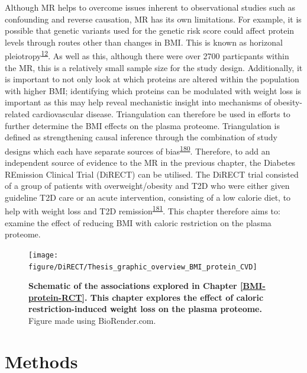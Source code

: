 \documentclass[11pt,twoside]{bristolthesis}
\begin{document}
Although MR helps to overcome issues inherent to observational studies such as confounding and reverse causation, MR has its own limitations. For example, it is possible that genetic variants used for the genetic risk score could affect protein levels through routes other than changes in BMI. This is known as horizonal pleiotropy\textsuperscript{\protect\hyperlink{ref-Davies2018}{12}}. As well as this, although there were over 2700 particpants within the MR, this is a relatively small sample size for the study design. Additionally, it is important to not only look at which proteins are altered within the population with higher BMI; identifying which proteins can be modulated with weight loss is important as this may help reveal mechanistic insight into mechanisms of obesity-related cardiovascular disease. Triangulation can therefore be used in efforts to further determine the BMI effects on the plasma proteome. Triangulation is defined as strengthening causal inference through the combination of study designs which each have separate sources of bias\textsuperscript{\protect\hyperlink{ref-Lawlor2016}{180}}. Therefore, to add an independent source of evidence to the MR in the previous chapter, the Diabetes REmission Clinical Trial (DiRECT) can be utilised. The DiRECT trial consisted of a group of patients with overweight/obesity and T2D who were either given guideline T2D care or an acute intervention, consisting of a low calorie diet, to help with weight loss and T2D remission\textsuperscript{\protect\hyperlink{ref-Lean2018}{181}}. This chapter therefore aims to: examine the effect of reducing BMI with caloric restriction on the plasma proteome.



\begin{figure}

{\centering \texttt{[image: figure/DiRECT/Thesis\_graphic\_overview\_BMI\_protein\_CVD]} 

}

\caption[Schematic of the associations explored in Chapter \ref{BMI-protein-RCT}]{\textbf{Schematic of the associations explored in Chapter \ref{BMI-protein-RCT}. This chapter explores the effect of caloric restriction-induced weight loss on the plasma proteome.} Figure made using BioRender.com.}\label{fig:BMI-protein-graphic2}
\end{figure}
\hypertarget{methods-3}{%
\section{Methods}\label{methods-3}}
\end{document}
